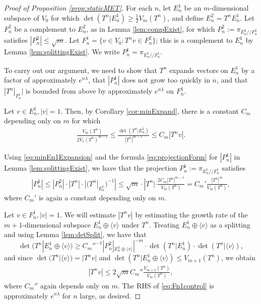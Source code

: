 \documentclass[11pt]{amsart}
\theoremstyle{theorem}
\theoremstyle{definition}
\numberwithin{equation}{section}
\newcommand{\ds}{/ \! /}
\newcommand{\ol}{\overline{\lambda}}
\newcommand{\ul}{\underline{\lambda}}
\begin{document}
\begin{proof}[Proof of Proposition \ref{prop:staticMET}]

For each $n$, let $E_n^1$ be an $m$-dimensional subspace of $V_0$ for which \linebreak $\det(T^n | E_n^1) \geq \frac{1}{2} V_m(T^n)$, and define $E_n^2 = T^n E_n^1$. Let $F_n^2$ be a complement to $E_n^2$, as in Lemma \ref{lem:compExist}, for which $P_n^2 := \pi_{E_n^2 \ds F_n^2}$ satisfies $|P_n^2| \leq \sqrt{m}$. Let $F_n^1 = \{v \in V_0 : T^n v \in F_n^2\}$; this is a complement to $E_n^1$ by Lemma \ref{lem:splittingExist}. We write $P_n^1 = \pi_{E_n^1 \ds F_n^1}$.

To carry out our argument, we need to show that $T^n$ expands vectors on $E_n^1$ by a factor of approximately $e^{n \ol}$, that $|P_n^1|$ does not grow too quickly in $n$, and that $|T^n|_{F_n^1}|$ is bounded from above by approximately $e^{n \ul}$ on $F_n^1$. 

\smallskip
{} Let $v \in E_n^1, |v| = 1$. Then, by Corollary \ref{cor:minExpand}, there is a constant $C_m$ depending only on $m$ for which
\begin{align}\label{eq:minEn1Expansion}
\frac{V_m(T^n)}{2V_1(T^n)^{m-1}} \leq \frac{\det(T^n | E_n^1)}{|T^n|^{m-1}} \leq C_m |T^n v|.
\end{align}

\smallskip
{} Using \eqref{eq:minEn1Expansion} and the formula \eqref{eq:projectionForm} for $|P_n^1|$ in Lemma \ref{lem:splittingExist}, we have that the projection $P_n^1 := \pi_{E_n^1 \ds F_n^1}$ satisfies
\begin{align} \label{eq:Pn1Control}
|P_n^1| \leq |P_n^2| \cdot |T^n| \cdot |(T^n|_{E_n^1})^{-1}| \leq \sqrt{m} \cdot |T^n| \cdot \frac{2 C_m |T^n|^{m-1}}{V_m(T^n)} = C_m' \frac{|T^n|^m}{V_m(T^n)},
\end{align}
where $C_m'$ is again a constant depending only on $m$.

\smallskip
{} Let $v \in F_n^1, |v| =1$. We will estimate $|T^n v|$ by estimating the growth rate of the $m + 1$-dimensional subspace $E_n^1 \oplus \langle v \rangle$ under $T^n$. Treating $E_n^1 \oplus \langle v \rangle$ as a splitting and using Lemma \ref{lem:detSplit}, we have that
\[
\det(T^n|E_n^1 \oplus \langle v \rangle ) \geq C_m''^{-1} |P_n^2|_{E_n^2 \oplus \langle v \rangle}|^{-m} \cdot \det(T^n|E_n^1) \cdot \det(T^n | \langle v \rangle ),
\]
and since $\det(T^n | \langle v \rangle ) = |T^n v|$ and $\det(T^n | E_n^1 \oplus \langle v \rangle ) \leq V_{m + 1}(T^n)$, we obtain
\begin{align}\label{eq:Fn1control}
|T^n v| \leq 2 \sqrt m C_m''  \frac{V_{m+1}(T^n)}{V_m(T^n)},
\end{align}
where $C_m''$ again depends only on $m$. The RHS of \eqref{eq:Fn1control} is approximately $e^{n \ul}$ for $n$ large, as desired.


\end{proof}
\end{document}
